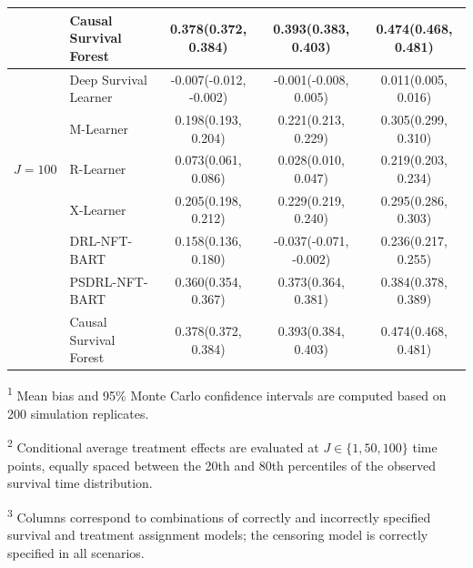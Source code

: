 \documentclass{article}
\begin{document}
\begin{table}[ht]
\begin{threeparttable}
{\begin{tabular}{llccc}
    &Causal Survival Forest& 0.378(0.372, 0.384) & 0.393(0.383, 0.403) & 0.474(0.468, 0.481)\\
             \hline
    \multirow{5}{*}{\(J = 100\)}
    &Deep Survival Learner & -0.007(-0.012, -0.002) & -0.001(-0.008, 0.005) & 0.011(0.005, 0.016)\\
    &M-Learner             & 0.198(0.193, 0.204) & 0.221(0.213, 0.229) & 0.305(0.299, 0.310)\\
    &R-Learner             & 0.073(0.061, 0.086) & 0.028(0.010, 0.047) & 0.219(0.203, 0.234)\\
    &X-Learner             & 0.205(0.198, 0.212) & 0.229(0.219, 0.240) & 0.295(0.286, 0.303)\\
    &DRL-NFT-BART          & 0.158(0.136, 0.180) & -0.037(-0.071, -0.002) & 0.236(0.217, 0.255)\\
    &PSDRL-NFT-BART        & 0.360(0.354, 0.367) & 0.373(0.364, 0.381) & 0.384(0.378, 0.389)\\
    &Causal Survival Forest& 0.378(0.372, 0.384) & 0.393(0.384, 0.403) & 0.474(0.468, 0.481)\\
             \hline
        \end{tabular}}
     \begin{tablenotes}\footnotesize
\item \textsuperscript{1} Mean bias and 95\% Monte Carlo confidence intervals are computed based on 200 simulation replicates.
\item \textsuperscript{2} Conditional average treatment effects are evaluated at \(J \in \{1, 50, 100\}\) time points, equally spaced between the 20th and 80th percentiles of the observed survival time distribution.
\item \textsuperscript{3} Columns correspond to combinations of correctly and incorrectly specified survival and treatment assignment models; the censoring model is correctly specified in all scenarios.
\end{tablenotes}
    \end{threeparttable}
\end{table}
\end{document}
